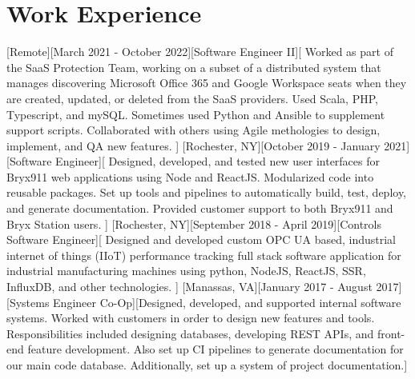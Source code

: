 \documentclass{resume}
\begin{document}
		\section{Work Experience}
		[Remote][March 2021 - October 2022][Software Engineer II][%
		Worked as part of the SaaS Protection Team, working on a subset of a distributed system that manages discovering Microsoft Office 365 and Google Workspace seats when they are created, updated, or deleted from the SaaS providers. %
		Used Scala, PHP, Typescript, and mySQL. Sometimes used Python and Ansible to supplement support scripts. %
		Collaborated with others using Agile methologies to design, implement, and QA new features. %
		]%
		[Rochester, NY][October 2019 - January 2021][Software Engineer][%
		Designed, developed, and tested new user interfaces for Bryx911 web applications using Node and ReactJS. %
		Modularized code into reusable packages. %
		Set up tools and pipelines to automatically build, test, deploy, and generate documentation. %
		Provided customer support to both Bryx911 and Bryx Station users.%
		]%
		[Rochester, NY][September 2018 - April 2019][Controls Software Engineer][%
		Designed and developed custom OPC UA based, industrial internet of things (IIoT) performance tracking full stack software application for industrial manufacturing machines using python, NodeJS, ReactJS, SSR, InfluxDB, and other technologies.%
		]%
		[Manassas, VA][January 2017 - August 2017][Systems Engineer Co-Op][Designed, developed, and supported internal software systems. Worked with customers in order to design new features and tools. Responsibilities included designing databases, developing REST APIs, and front-end feature development. Also set up CI pipelines to generate documentation for our main code database. Additionally, set up a system of project documentation.]%
\end{document}
